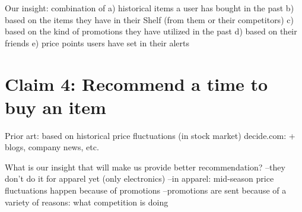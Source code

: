 \documentclass[11pt]{article}
\begin{document}
Our insight: combination of
a) historical items a user has bought in the past
b) based on the items they have in their Shelf (from them or their competitors)
c) based on the kind of promotions they have utilized in the past
d) based on their friends
e) price points users have set in their alerts


\section{Claim 4: Recommend a time to buy an item} 
Prior art: based on historical price fluctuations (in stock market)
decide.com: + blogs, company news, etc.

What is our insight that will make us provide better recommendation?
--they don't do it for apparel yet (only electronics)
--in apparel: mid-season price fluctuations happen because of promotions
--promotions are sent because of a variety of reasons: what competition is doing

\fi
\end{document}
